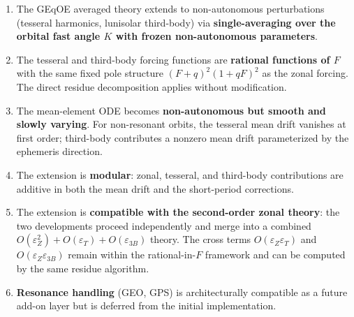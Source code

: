 \documentclass[11pt]{article}
\newcommand{\eps}{\varepsilon}
\begin{document}
\begin{enumerate}
\item The GEqOE averaged theory extends to non-autonomous perturbations
(tesseral harmonics, lunisolar third-body) via \textbf{single-averaging
over the orbital fast angle $K$ with frozen non-autonomous parameters}.

\item The tesseral and third-body forcing functions are \textbf{rational
functions of $F$} with the same fixed pole structure
$(F+q)^2(1+qF)^2$ as the zonal forcing. The direct residue decomposition
applies without modification.

\item The mean-element ODE becomes \textbf{non-autonomous but smooth and
slowly varying}. For non-resonant orbits, the tesseral mean drift vanishes
at first order; third-body contributes a nonzero mean drift parameterized
by the ephemeris direction.

\item The extension is \textbf{modular}: zonal, tesseral, and third-body
contributions are additive in both the mean drift and the short-period
corrections.

\item The extension is \textbf{compatible with the second-order zonal
theory}: the two developments proceed independently and merge into a
combined $O(\eps_Z^2) + O(\eps_T) + O(\eps_{3B})$ theory. The cross
terms $O(\eps_Z \eps_T)$ and $O(\eps_Z \eps_{3B})$ remain within the
rational-in-$F$ framework and can be computed by the same residue
algorithm.

\item \textbf{Resonance handling} (GEO, GPS) is architecturally compatible
as a future add-on layer but is deferred from the initial implementation.
\end{enumerate}
\end{document}
